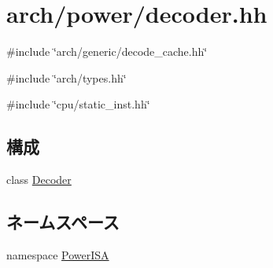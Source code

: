 \hypertarget{power_2decoder_8hh}{
\section{arch/power/decoder.hh}
\label{power_2decoder_8hh}
}
{\ttfamily \#include \char`\"{}arch/generic/decode\_\-cache.hh\char`\"{}}\par
{\ttfamily \#include \char`\"{}arch/types.hh\char`\"{}}\par
{\ttfamily \#include \char`\"{}cpu/static\_\-inst.hh\char`\"{}}\par
\subsection*{構成}
\begin{DoxyCompactItemize}
\item 
class \hyperlink{classPowerISA_1_1Decoder}{Decoder}
\end{DoxyCompactItemize}
\subsection*{ネームスペース}
\begin{DoxyCompactItemize}
\item 
namespace \hyperlink{namespacePowerISA}{PowerISA}
\end{DoxyCompactItemize}
